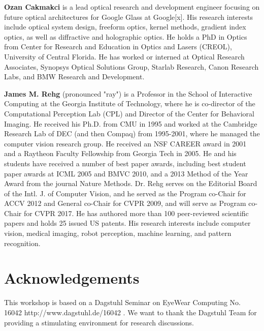 \documentclass{sigchi-ext}
\begin{document}
{\bf Ozan Cakmakci} is a lead optical research and development engineer focusing on future optical architectures for Google Glass at Google[x]. His research interests include optical system design, freeform optics, kernel methods, gradient index optics, as well as diffractive and holographic optics. He holds a PhD in Optics from Center for Research and Education in Optics and Lasers (CREOL), University of Central Florida. He has worked or interned at Optical Research Associates, Synopsys Optical Solutions Group, Starlab Research, Canon Research Labs, and BMW Research and Development.


{\bf James M. Rehg} (pronounced "ray") is a Professor in the School of Interactive Computing at the Georgia Institute of Technology, where he is co-director of the Computational Perception Lab (CPL) and Director of the Center for Behavioral Imaging. He received his Ph.D. from CMU in 1995 and worked at the Cambridge Research Lab of DEC (and then Compaq) from 1995-2001, where he managed the computer vision research group. He received an NSF CAREER award in 2001 and a Raytheon Faculty Fellowship from Georgia Tech in 2005. He and his students have received a number of best paper awards, including best student paper awards at ICML 2005 and BMVC 2010, and a 2013 Method of the Year Award from the journal Nature Methods. Dr. Rehg serves on the Editorial Board of the Intl. J. of Computer Vision, and he served as the Program co-Chair for ACCV 2012 and General co-Chair for CVPR 2009, and will serve as Program co-Chair for CVPR 2017. He has authored more than 100 peer-reviewed scientific papers and holds 25 issued US patents. His research interests include computer vision, medical imaging, robot perception, machine learning, and pattern recognition.

\section{Acknowledgements}
This workshop is based on a Dagstuhl Seminar on EyeWear Computing No. 16042 http://www.dagstuhl.de/16042 . We want to thank the Dagstuhl Team for providing a stimulating environment for research discussions.

\balance{} 



\end{document}
